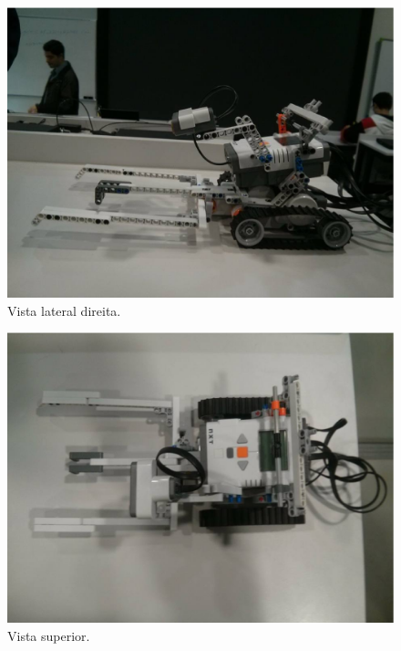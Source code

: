 \begin{apendicesenv}
\begin{figure}[h]
    \centering
    \includegraphics[keepaspectratio=true,scale=0.55]
      {figuras/robo_006.eps}
    \caption{Vista lateral direita.}
\end{figure}

\begin{figure}[h]
    \centering
    \includegraphics[keepaspectratio=true,scale=0.55]
      {figuras/robo_008.eps}
    \caption{Vista superior.}
\end{figure}


\end{apendicesenv}
